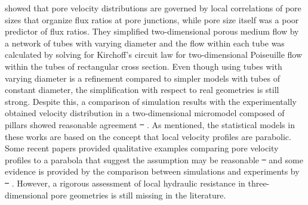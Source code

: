 \documentclass[draft]{agujournal2019}
\providecommand{\DIFadd}[1]{{\protect\color{blue}\uwave{#1}}} %
\providecommand{\DIFdel}[1]{{\protect\color{red}\sout{#1}}}                      %
\providecommand{\DIFaddbegin}{} %
\providecommand{\DIFaddend}{} %
\providecommand{\DIFdelbegin}{} %
\providecommand{\DIFdelend}{} %
\begin{document}
{{ }%
}\DIFaddend showed that pore velocity distributions are governed by local correlations of pore sizes that organize flux ratios at pore junctions, while pore size itself was a poor predictor of flux ratios. They simplified two-dimensional porous medium flow by a network of tubes with varying diameter and the flow within each tube was calculated by solving for Kirchoff’s circuit law for two-dimensional Poiseuille flow within the tubes of rectangular cross section. Even though using tubes with varying diameter is a refinement compared to simpler models with tubes of constant diameter, the simplification with respect to real geometries is still strong. Despite this, a comparison of simulation results with the experimentally obtained velocity distribution in a two-dimensional micromodel composed of pillars showed reasonable agreement \DIFdelbegin \DIFdel{\mbox{%
}%
}\DIFdelend \DIFaddbegin \DIFadd{\mbox{%
\cite{alim_local_2017}}%
}\DIFaddend . As mentioned, the statistical models in these works are based on the concept that local velocity profiles are parabolic. Some recent papers provided qualitative examples comparing pore velocity profiles to a parabola that suggest the assumption may be reasonable \DIFdelbegin \DIFdel{\mbox{%
\citeA{de_anna_prediction_2017,dentz_mechanisms_2018} }%
}\DIFdelend \DIFaddbegin \DIFadd{\mbox{%
\cite{de_anna_prediction_2017,dentz_mechanisms_2018} }%
}\DIFaddend and some evidence is provided by the comparison between simulations and experiments by \DIFdelbegin \DIFdel{\mbox{%
\cite{alim_local_2017}}%
}\DIFdelend \DIFaddbegin \DIFadd{\mbox{%
\citeA{alim_local_2017}}%
}\DIFaddend . However, a rigorous assessment of local hydraulic resistance in three-dimensional pore geometries is still missing in the literature. 
\end{document}
